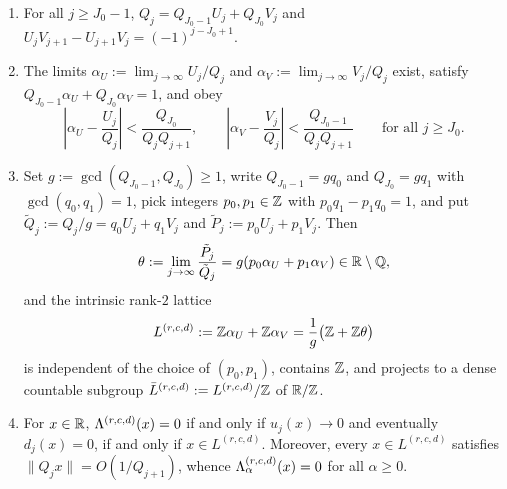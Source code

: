 \begin{lemma}\label{lem:poly-lattice}
\begin{enumerate}[label=(\roman*),leftmargin=2em]
\item For all $j\ge J_0-1$, $Q_j=Q_{J_0-1}U_j+Q_{J_0}V_j$ and
$U_jV_{j+1}-U_{j+1}V_j=(-1)^{j-J_0+1}$.
\item The limits $\alpha_U:=\lim_{j\to\infty}U_j/Q_j$ and
$\alpha_V:=\lim_{j\to\infty}V_j/Q_j$ exist, satisfy
$Q_{J_0-1}\alpha_U+Q_{J_0}\alpha_V=1$, and obey
\[
\left|\alpha_U-\frac{U_j}{Q_j}\right|<\frac{Q_{J_0}}{Q_jQ_{j+1}},\qquad
\left|\alpha_V-\frac{V_j}{Q_j}\right|<\frac{Q_{J_0-1}}{Q_jQ_{j+1}}
\qquad\text{for all }j\ge J_0.
\]
\item Set $g:=\gcd(Q_{J_0-1},Q_{J_0})\ge1$, write $Q_{J_0-1}=gq_0$ and
$Q_{J_0}=gq_1$ with $\gcd(q_0,q_1)=1$, pick integers $p_0,p_1\in\mathbb{Z}$ with
$p_0q_1-p_1q_0=1$, and put $\tilde Q_j:=Q_j/g=q_0U_j+q_1V_j$ and
$\tilde P_j:=p_0U_j+p_1V_j$. Then
\[
\theta:=\lim_{j\to\infty}\frac{\tilde P_j}{\tilde Q_j}=g(p_0\alpha_U+p_1\alpha_V)\in\mathbb{R}\setminus\mathbb{Q},
\]
and the intrinsic rank-$2$ lattice
\[
L^{(r,c,d)}:=\mathbb{Z}\alpha_U+\mathbb{Z}\alpha_V=\frac{1}{g}\bigl(\mathbb{Z}+\mathbb{Z}\theta\bigr)
\]
is independent of the choice of $(p_0,p_1)$, contains $\mathbb{Z}$, and projects to a
dense countable subgroup $\bar L^{(r,c,d)}:=L^{(r,c,d)}/\mathbb{Z}$ of $\mathbb{R}/\mathbb{Z}$.
\item For $x\in\mathbb{R}$, $\Lambda^{(r,c,d)}(x)=0$ if and only if $u_j(x)\to0$ and
eventually $d_j(x)=0$, if and only if $x\in L^{(r,c,d)}$. Moreover, every
$x\in L^{(r,c,d)}$ satisfies $\|Q_jx\|=O(1/Q_{j+1})$, whence
$\Lambda_\alpha^{(r,c,d)}(x)=0$ for all $\alpha\ge0$.
\end{enumerate}
\end{lemma}

